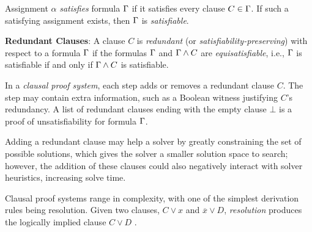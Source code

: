 Assignment $\alpha$ \emph{satisfies} formula $\Gamma$ if it satisfies every
clause $C \in \Gamma$. If such a satisfying assignment exists, then $\Gamma$
is \emph{satisfiable}.

\textbf{Redundant Clauses}: A clause $C$ is \emph{redundant} (or
\emph{satisfiability-preserving}) with respect to a formula $\Gamma$ if the
formulas $\Gamma$ and $\Gamma \land C$ are \emph{equisatisfiable}, i.e.,
$\Gamma$ is satisfiable if and only if $\Gamma \land C$ is satisfiable.

In a \emph{clausal proof system}, each step adds or removes a redundant clause
$C$. The step may contain extra information, such as a Boolean witness
justifying $C$'s redundancy. A list of redundant clauses ending with the empty
clause $\bot$ is a proof of unsatisfiability for formula $\Gamma$.


Adding a redundant clause may help a solver by greatly constraining the set of possible solutions,
which gives the solver a smaller solution space to search; however,
the addition of these clauses could also negatively interact with solver heuristics,
increasing solve time.


Clausal proof systems range in complexity, with one of the simplest derivation
rules being resolution. Given two clauses, $C \lor x$ and $\overline{x} \lor D$,
\emph{resolution} produces the logically implied clause  $C \lor D$ .

